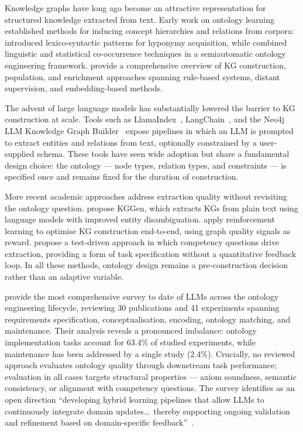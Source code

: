 Knowledge graphs have long ago become an attractive representation for structured knowledge extracted
from text. Early work on ontology learning established methods for inducing concept hierarchies
and relations from corpora: \citet{hearst1992hyponyms} introduced lexico-syntactic
patterns for hyponymy acquisition, while \citet{maedche2001ontologylearning} combined
linguistic and statistical co-occurrence techniques in a semiautomatic ontology
engineering framework. \citet{hogan2021kgsurvey} provide a comprehensive
overview of KG construction, population, and enrichment approaches spanning rule-based
systems, distant supervision, and embedding-based methods.

The advent of large language models has substantially lowered the barrier to KG
construction at scale. Tools such as LlamaIndex~\cite{liu2022llamaindex},
LangChain~\cite{chase2022langchain}, and the Neo4j LLM Knowledge Graph
Builder~\cite{neo4j2024llmgraphbuilder} expose pipelines in which an LLM is prompted to
extract entities and relations from text, optionally constrained by a user-supplied schema.
These tools have seen wide adoption but share a fundamental design choice: the ontology
--- node types, relation types, and constraints --- is specified once and remains fixed for
the duration of construction.

More recent academic approaches address extraction quality without revisiting the ontology
question. \citet{mo2025kggen} propose KGGen, which extracts KGs from plain text using
language models with improved entity disambiguation. \citet{tsang2025autographr1} apply
reinforcement learning to optimise KG construction end-to-end, using graph quality signals
as reward. \citet{mynarz2023testdriven} propose a test-driven approach in which competency
questions drive extraction, providing a form of task specification without a quantitative
feedback loop. In all these methods, ontology design remains a pre-construction decision
rather than an adaptive variable.

\citet{li2025llmontologyreview} provide the most comprehensive survey to date of LLMs
across the ontology engineering lifecycle, reviewing 30 publications and 41 experiments
spanning requirements specification, conceptualisation, encoding, ontology matching, and
maintenance. Their analysis reveals a pronounced imbalance: ontology implementation tasks
account for 63.4\% of studied experiments, while maintenance has been addressed by a single
study (2.4\%). Crucially, no reviewed approach evaluates ontology quality through downstream
task performance; evaluation in all cases targets structural properties --- axiom soundness,
semantic consistency, or alignment with competency questions. The survey identifies as an
open direction ``developing hybrid learning pipelines that allow LLMs to continuously
integrate domain updates\ldots\ thereby supporting ongoing validation and refinement based
on domain-specific feedback''~\citep{li2025llmontologyreview}.

